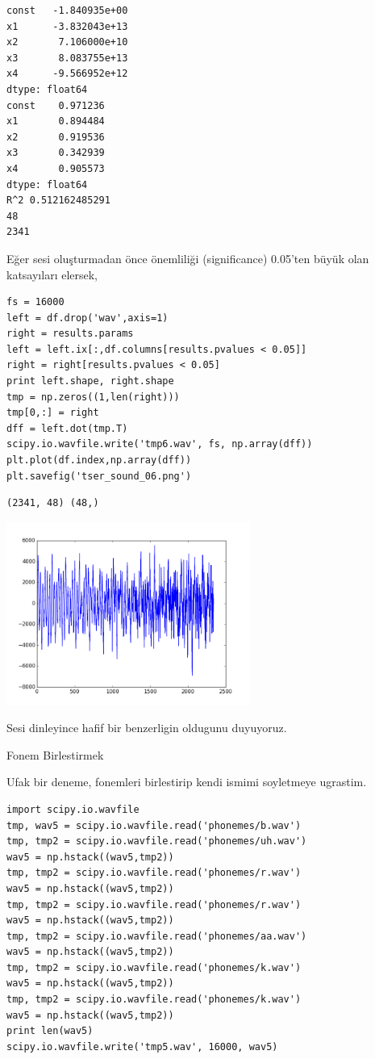 \documentclass[12pt,fleqn]{article}\usepackage{../../common}
\begin{document}
\begin{verbatim}
const   -1.840935e+00
x1      -3.832043e+13
x2       7.106000e+10
x3       8.083755e+13
x4      -9.566952e+12
dtype: float64
const    0.971236
x1       0.894484
x2       0.919536
x3       0.342939
x4       0.905573
dtype: float64
R^2 0.512162485291
48
2341
\end{verbatim}

Eğer sesi oluşturmadan önce önemliliği (significance) 0.05'ten büyük olan
katsayıları elersek, 

\begin{verbatim}
fs = 16000 
left = df.drop('wav',axis=1)
right = results.params
left = left.ix[:,df.columns[results.pvalues < 0.05]]
right = right[results.pvalues < 0.05]
print left.shape, right.shape
tmp = np.zeros((1,len(right)))
tmp[0,:] = right
dff = left.dot(tmp.T)
scipy.io.wavfile.write('tmp6.wav', fs, np.array(dff))
plt.plot(df.index,np.array(dff))
plt.savefig('tser_sound_06.png')
\end{verbatim}

\begin{verbatim}
(2341, 48) (48,)
\end{verbatim}

\includegraphics[height=6cm]{tser_sound_06.png}

Sesi dinleyince hafif bir benzerligin oldugunu duyuyoruz. 

Fonem Birlestirmek

Ufak bir deneme, fonemleri birlestirip kendi ismimi soyletmeye ugrastim.

\begin{verbatim}
import scipy.io.wavfile
tmp, wav5 = scipy.io.wavfile.read('phonemes/b.wav')
tmp, tmp2 = scipy.io.wavfile.read('phonemes/uh.wav')
wav5 = np.hstack((wav5,tmp2))
tmp, tmp2 = scipy.io.wavfile.read('phonemes/r.wav')
wav5 = np.hstack((wav5,tmp2))
tmp, tmp2 = scipy.io.wavfile.read('phonemes/r.wav')
wav5 = np.hstack((wav5,tmp2))
tmp, tmp2 = scipy.io.wavfile.read('phonemes/aa.wav')
wav5 = np.hstack((wav5,tmp2))
tmp, tmp2 = scipy.io.wavfile.read('phonemes/k.wav')
wav5 = np.hstack((wav5,tmp2))
tmp, tmp2 = scipy.io.wavfile.read('phonemes/k.wav')
wav5 = np.hstack((wav5,tmp2))
print len(wav5)
scipy.io.wavfile.write('tmp5.wav', 16000, wav5)
\end{verbatim}
\end{document}
